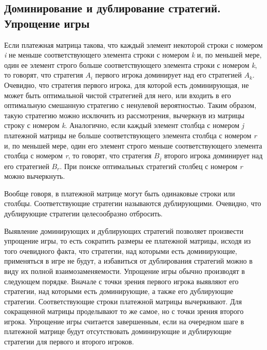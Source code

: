 \subsection{Доминирование и дублирование стратегий. Упрощение игры}

Если платежная матрица такова, что каждый элемент некоторой строки с номером \emph{i} не меньше соответствующего элемента строки с номером \emph{k} и, по меньшей мере, один ее элемент строго больше соответствующего элемента строки с номером \emph{k}, то говорят, что стратегия $A_i$ первого  игрока  доминирует над его стратегией $A_k.$ Очевидно, что стратегия первого игрока, для которой есть доминирующая, не может быть оптимальной чистой стратегией для него, или входить в его оптимальную смешанную стратегию с ненулевой вероятностью. Таким образом, такую стратегию можно исключить из рассмотрения, вычеркнув из матрицы строку с номером \emph{k}. Аналогично, если каждый элемент столбца с номером \emph{j} платежной матрицы не больше соответствующего элемента столбца с номером \emph{r} и, по меньшей мере, один его элемент строго меньше соответствующего элемента столбца с номером \emph{r}, то говорят, что стратегия $B_j$ второго игрока доминирует над его стратегией $B_r.$ При поиске оптимальных стратегий столбец с номером \emph{r} можно вычеркнуть.

Вообще говоря, в платежной матрице могут быть одинаковые строки или столбцы. Соответствующие стратегии называются дублирующими. Очевидно, что дублирующие стратегии целесообразно отбросить.

Выявление доминирующих и дублирующих стратегий позволяет произвести упрощение игры, то есть сократить размеры ее платежной матрицы, исходя из того очевидного факта, что стратегии, над которыми есть доминирующие, применяться в игре не будут, а избавиться от дублирования стратегий можно в виду их полной взаимозаменяемости. Упрощение игры обычно производят в следующем порядке. Вначале с точки зрения первого игрока выявляют его стратегии, над которыми есть доминирующие, а также его дублирующие стратегии. Соответствующие строки платежной матрицы вычеркивают. Для сокращенной матрицы проделывают то же самое, но с точки зрения второго игрока. Упрощение игры считается завершенным, если на очередном шаге в платежной матрице будут отсутствовать доминирующие и дублирующие стратегии для первого и второго игроков.


